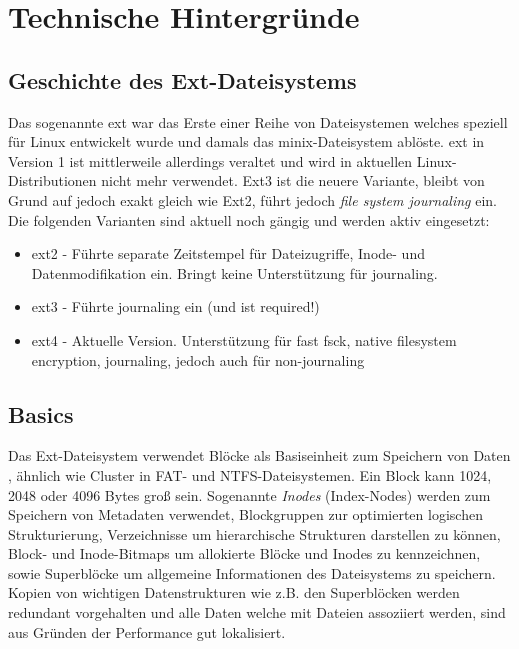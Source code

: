 



\section{Technische Hintergründe}

\subsection{Geschichte des Ext-Dateisystems}


Das sogenannte \ac{ext} war das Erste einer Reihe von Dateisystemen welches speziell für Linux entwickelt wurde und damals das minix-Dateisystem ablöste. \ac{ext} in Version 1 ist mittlerweile allerdings veraltet und wird in aktuellen Linux-Distributionen nicht mehr verwendet. Ext3 ist die neuere Variante, bleibt von Grund auf jedoch exakt gleich wie Ext2, führt jedoch \textit{file system journaling} ein. Die folgenden Varianten sind aktuell noch gängig und werden aktiv eingesetzt:

\begin{itemize}
	\item ext2 - Führte separate Zeitstempel für Dateizugriffe, Inode- und Datenmodifikation ein. Bringt keine Unterstützung für journaling.
	\item ext3 - Führte journaling ein (und ist required!)
	\item ext4 - Aktuelle Version. Unterstützung für fast fsck, native filesystem encryption, journaling, jedoch auch für non-journaling
\end{itemize}

\subsection{Basics}

Das Ext-Dateisystem verwendet Blöcke als Basiseinheit zum Speichern von Daten \cite{Ext2.07.01.2022}, ähnlich wie Cluster in FAT- und NTFS-Dateisystemen. Ein Block kann 1024, 2048 oder 4096 Bytes groß sein. Sogenannte \textit{Inodes }(Index-Nodes) werden zum Speichern von Metadaten verwendet, Blockgruppen zur optimierten logischen Strukturierung, Verzeichnisse um hierarchische Strukturen darstellen zu können, Block- und Inode-Bitmaps um allokierte Blöcke und Inodes zu kennzeichnen, sowie Superblöcke um allgemeine Informationen des Dateisystems zu speichern. Kopien von wichtigen Datenstrukturen wie z.B. den Superblöcken werden redundant vorgehalten und alle Daten welche mit Dateien assoziiert werden, sind aus Gründen der Performance gut lokalisiert\cite{Carrier.06.01.2022}.

